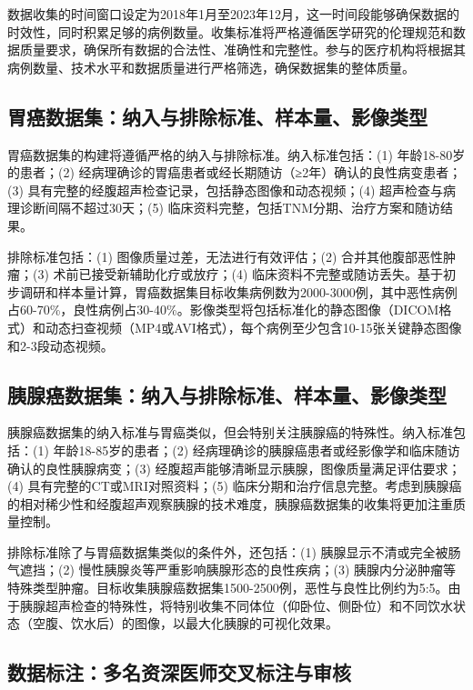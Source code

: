 数据收集的时间窗口设定为2018年1月至2023年12月，这一时间段能够确保数据的时效性，同时积累足够的病例数量。收集标准将严格遵循医学研究的伦理规范和数据质量要求，确保所有数据的合法性、准确性和完整性。参与的医疗机构将根据其病例数量、技术水平和数据质量进行严格筛选，确保数据集的整体质量。

\subsection{胃癌数据集：纳入与排除标准、样本量、影像类型}

胃癌数据集的构建将遵循严格的纳入与排除标准。纳入标准包括：(1) 年龄18-80岁的患者；(2) 经病理确诊的胃癌患者或经长期随访（≥2年）确认的良性病变患者；(3) 具有完整的经腹超声检查记录，包括静态图像和动态视频；(4) 超声检查与病理诊断间隔不超过30天；(5) 临床资料完整，包括TNM分期、治疗方案和随访结果。

排除标准包括：(1) 图像质量过差，无法进行有效评估；(2) 合并其他腹部恶性肿瘤；(3) 术前已接受新辅助化疗或放疗；(4) 临床资料不完整或随访丢失。基于初步调研和样本量计算，胃癌数据集目标收集病例数为2000-3000例，其中恶性病例占60-70\%，良性病例占30-40\%。影像类型将包括标准化的静态图像（DICOM格式）和动态扫查视频（MP4或AVI格式），每个病例至少包含10-15张关键静态图像和2-3段动态视频。

\subsection{胰腺癌数据集：纳入与排除标准、样本量、影像类型}

胰腺癌数据集的纳入标准与胃癌类似，但会特别关注胰腺癌的特殊性。纳入标准包括：(1) 年龄18-85岁的患者；(2) 经病理确诊的胰腺癌患者或经影像学和临床随访确认的良性胰腺病变；(3) 经腹超声能够清晰显示胰腺，图像质量满足评估要求；(4) 具有完整的CT或MRI对照资料；(5) 临床分期和治疗信息完整。考虑到胰腺癌的相对稀少性和经腹超声观察胰腺的技术难度，胰腺癌数据集的收集将更加注重质量控制。

排除标准除了与胃癌数据集类似的条件外，还包括：(1) 胰腺显示不清或完全被肠气遮挡；(2) 慢性胰腺炎等严重影响胰腺形态的良性疾病；(3) 胰腺内分泌肿瘤等特殊类型肿瘤。目标收集胰腺癌数据集1500-2500例，恶性与良性比例约为5:5。由于胰腺超声检查的特殊性，将特别收集不同体位（仰卧位、侧卧位）和不同饮水状态（空腹、饮水后）的图像，以最大化胰腺的可视化效果。

\subsection{数据标注：多名资深医师交叉标注与审核}


